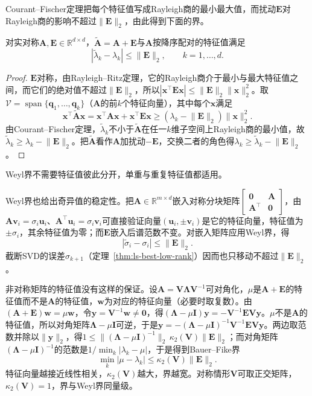 Courant--Fischer定理把每个特征值写成Rayleigh商的最小最大值，而扰动$\bm E$对Rayleigh商的影响不超过$\lVert\bm E\rVert_2$，由此得到下面的界。
\begin{theorem}[Weyl特征值扰动界]
\label{thm:ls-weyl-eigenvalue}
对实对称$\bm A,\bm E\in\mathbb R^{d\times d}$，$\widetilde{\bm A}=\bm A+\bm E$与$\bm A$按降序配对的特征值满足
\begin{equation}
 |\widetilde\lambda_k-\lambda_k|
 \leq\lVert\bm E\rVert_2,
 \qquad k=1,\dots,d.
 \label{eq:matrix-analysis-weyl-eigenvalue-perturbation}
\end{equation}
\end{theorem}
\begin{proof}
$\bm E$对称，由Rayleigh--Ritz定理，它的Rayleigh商介于最小与最大特征值之间，而它们的绝对值不超过$\lVert\bm E\rVert_2$，所以$|\bm x^\top\bm E\bm x|\leq\lVert\bm E\rVert_2\lVert\bm x\rVert_2^2$。取$\mathcal V=\operatorname{span}\{\bm q_1,\ldots,\bm q_k\}$（$\bm A$的前$k$个特征向量），其中每个$\bm x$满足
\[
 \bm x^\top\widetilde{\bm A}\bm x=\bm x^\top\bm A\bm x+\bm x^\top\bm E\bm x\geq(\lambda_k-\lVert\bm E\rVert_2)\lVert\bm x\rVert_2^2 .
\]
由Courant--Fischer定理，$\widetilde\lambda_k$不小于$\widetilde{\bm A}$在任一$k$维子空间上Rayleigh商的最小值，故$\widetilde\lambda_k\geq\lambda_k-\lVert\bm E\rVert_2$。把$\widetilde{\bm A}$看作$\bm A$加扰动$-\bm E$，交换二者的角色得$\lambda_k\geq\widetilde\lambda_k-\lVert\bm E\rVert_2$。
\end{proof}

Weyl界不需要特征值彼此分开，单重与重复特征值都适用。

Weyl界也给出奇异值的稳定性。把$\bm A\in\mathbb R^{m\times d}$嵌入对称分块矩阵$\left[\begin{smallmatrix}\bm0&\bm A\\\bm A^\top&\bm0\end{smallmatrix}\right]$，由$\bm A\bm v_i=\sigma_i\bm u_i$、$\bm A^\top\bm u_i=\sigma_i\bm v_i$可直接验证向量$(\bm u_i,\pm\bm v_i)$是它的特征向量，特征值为$\pm\sigma_i$，其余特征值为零；而$\bm E$嵌入后谱范数不变。对嵌入矩阵应用Weyl界，得
\begin{equation}
 |\widetilde\sigma_i-\sigma_i|\leq\lVert\bm E\rVert_2 .
 \label{eq:matrix-analysis-singular-value-perturbation}
\end{equation}
截断SVD的误差$\sigma_{k+1}$（定理~\ref{thm:ls-best-low-rank}）因而也只移动不超过$\lVert\bm E\rVert_2$。

非对称矩阵的特征值没有这样的保证。设$\bm A=\bm V\bm\Lambda\bm V^{-1}$可对角化，$\mu$是$\bm A+\bm E$的特征值而不是$\bm A$的特征值，$\bm w$为对应的特征向量（必要时取复数）。由$(\bm A+\bm E)\bm w=\mu\bm w$，令$\bm y=\bm V^{-1}\bm w\neq\bm0$，得$(\bm\Lambda-\mu\bm I)\bm y=-\bm V^{-1}\bm E\bm V\bm y$。$\mu$不是$\bm A$的特征值，所以对角矩阵$\bm\Lambda-\mu\bm I$可逆，于是$\bm y=-(\bm\Lambda-\mu\bm I)^{-1}\bm V^{-1}\bm E\bm V\bm y$。两边取范数并除以$\lVert\bm y\rVert_2$，得$1\leq\lVert(\bm\Lambda-\mu\bm I)^{-1}\rVert_2\,\kappa_2(\bm V)\lVert\bm E\rVert_2$；而对角矩阵$(\bm\Lambda-\mu\bm I)^{-1}$的范数是$1/\min_k|\lambda_k-\mu|$，于是得到Bauer--Fike界
\[
 \min_k|\mu-\lambda_k|\leq\kappa_2(\bm V)\lVert\bm E\rVert_2 .
\]
特征向量越接近线性相关，$\kappa_2(\bm V)$越大，界越宽。对称情形$\bm V$可取正交矩阵，$\kappa_2(\bm V)=1$，界与Weyl界同量级。

